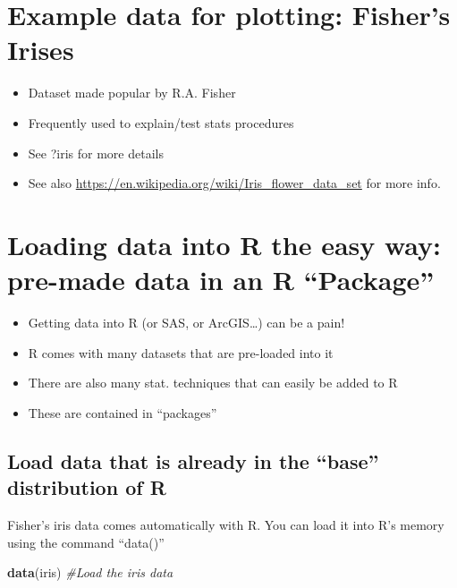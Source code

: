 \documentclass[]{book}
\newenvironment{Shaded}{\begin{snugshade}}{\end{snugshade}}
\newcommand{\KeywordTok}[1]{\textcolor[rgb]{0.13,0.29,0.53}{\textbf{#1}}}
\newcommand{\CommentTok}[1]{\textcolor[rgb]{0.56,0.35,0.01}{\textit{#1}}}
\newcommand{\NormalTok}[1]{#1}
\providecommand{\tightlist}{%
  \setlength{\itemsep}{0pt}\setlength{\parskip}{0pt}}
\theoremstyle{definition}
\theoremstyle{definition}
\theoremstyle{definition}
\theoremstyle{remark}
\begin{document}
\section{Example data for plotting: Fisher's
Irises}\label{example-data-for-plotting-fishers-irises}

\begin{itemize}
\tightlist
\item
  Dataset made popular by R.A. Fisher
\item
  Frequently used to explain/test stats procedures
\item
  See ?iris for more details
\item
  See also \url{https://en.wikipedia.org/wiki/Iris_flower_data_set} for
  more info.
\end{itemize}

\section{\texorpdfstring{Loading data into R the easy way: pre-made data
in an R
``Package''}{Loading data into R the easy way: pre-made data in an R Package}}\label{loading-data-into-r-the-easy-way-pre-made-data-in-an-r-package}

\begin{itemize}
\tightlist
\item
  Getting data into R (or SAS, or ArcGIS\ldots{}) can be a pain!
\item
  R comes with many datasets that are pre-loaded into it
\item
  There are also many stat. techniques that can easily be added to R
\item
  These are contained in ``packages''
\end{itemize}

\subsection{\texorpdfstring{Load data that is already in the ``base''
distribution of
R}{Load data that is already in the base distribution of R}}\label{load-data-that-is-already-in-the-base-distribution-of-r}

Fisher's iris data comes automatically with R. You can load it into R's
memory using the command ``data()''

\begin{Shaded}
\begin{Highlighting}[]
\KeywordTok{data}\NormalTok{(iris) }\CommentTok{#Load the iris data}
\end{Highlighting}
\end{Shaded}
\end{document}
